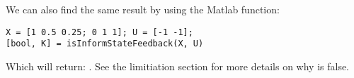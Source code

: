 We can also find the same result by using the Matlab function:
\begin{lstlisting}
X = [1 0.5 0.25; 0 1 1]; U = [-1 -1];
[bool, K] = isInformStateFeedback(X, U)
\end{lstlisting}
Which will return: \mon{[ 0, [-1 -0.5] ]}. See the limitiation section for more details on why  is false.

%
%
